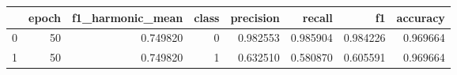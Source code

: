 \begin{tabular}{lrrrrrrr}
\toprule
 & epoch & f1_harmonic_mean & class & precision & recall & f1 & accuracy \\
\midrule
0 & 50 & 0.749820 & 0 & 0.982553 & 0.985904 & 0.984226 & 0.969664 \\
1 & 50 & 0.749820 & 1 & 0.632510 & 0.580870 & 0.605591 & 0.969664 \\
\bottomrule
\end{tabular}

